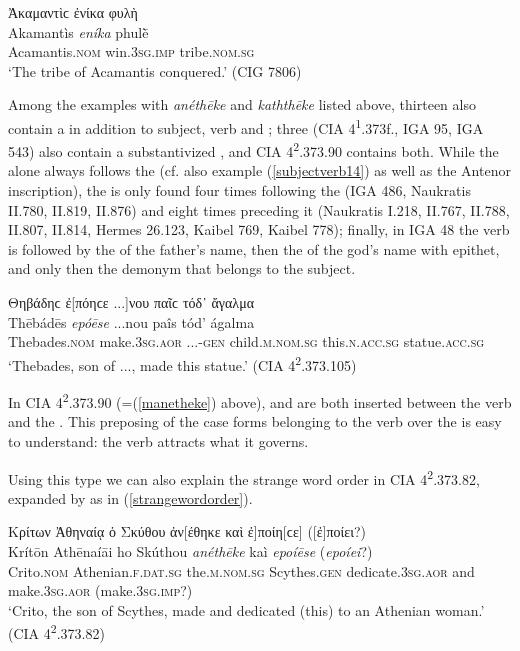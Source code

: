 \begin{exe}
\ex Ἀκαμαντὶϲ ἐνίκα φυλὴ\\
\gll Akamantìs \emph{eníka} phulḕ\\
Acamantis.\textsc{nom} win.\textsc{3sg.imp} tribe.\textsc{nom.sg}\\
\trans `The tribe of Acamantis conquered.' (CIG 7806) 
\label{subjectverb13}
\end{exe}

Among the examples with \emph{anéthēke} and \emph{kaththēke} listed above, thirteen also contain a  in addition to subject, verb and ; three (CIA 4\textsuperscript{1}.373f., IGA 95, IGA 543) also contain a substantivized , and CIA 4\textsuperscript{2}.373.90 contains both. While the  alone always follows the  (cf. also example (\ref{subjectverb14}) as well as the Antenor inscription), the  is only found four times following the  (IGA 486, Naukratis II.780, II.819, II.876) and eight times preceding it (Naukratis I.218, II.767, II.788, II.807, II.814, Hermes 26.123, Kaibel 769, Kaibel 778); finally, in IGA 48 the verb is followed by the  of the father's name, then the  of the god's name with epithet, and only then the  demonym that belongs to the subject.

\begin{exe}
\ex Θηβάδηϲ ἐ{[}πόηϲε ...{]}νου παῖϲ τόδ᾽ ἄγαλμα\\
\gll Thēbádēs \emph{epóēse} ...nou paîs tód' ágalma\\
Thebades.\textsc{nom} make.\textsc{3sg.aor} ...-\textsc{gen} child.\textsc{m.nom.sg} this.\textsc{n.acc.sg} statue.\textsc{acc.sg}\\
\trans `Thebades, son of ..., made this statue.' (CIA 4\textsuperscript{2}.373.105) 
\label{subjectverb14}
\end{exe}

In CIA 4\textsuperscript{2}.373.90 (=(\ref{manetheke}) above),  and  are both inserted between the verb and the . This preposing of the case forms belonging to the verb over the  is easy to understand: the verb attracts what it governs.

Using this type we can also explain the strange word order in CIA 4\textsuperscript{2}.373.82, expanded by \citet[143]{Studniczka1887} as in (\ref{strangewordorder}).

\begin{exe}
\ex Κρίτων Ἀθηναίᾳ ὁ Σκύθου ἀν{[}έθηκε καὶ ἐ{]}ποίη{[}ϲε{]} ({[}ἐ{]}ποίει?)\\
\gll Krítōn Athēnaíāi ho Skúthou \emph{anéthēke} kaì \emph{epoíēse} (\emph{epoíei}?)\\
Crito.\textsc{nom} Athenian.\textsc{f.dat.sg} the.\textsc{m.nom.sg} Scythes.\textsc{gen} dedicate.\textsc{3sg.aor} and make.\textsc{3sg.aor} (make.\textsc{3sg.imp}?)\\
\trans `Crito, the son of Scythes, made and dedicated (this) to an Athenian woman.' (CIA 4\textsuperscript{2}.373.82) 
\label{strangewordorder}
\end{exe}


